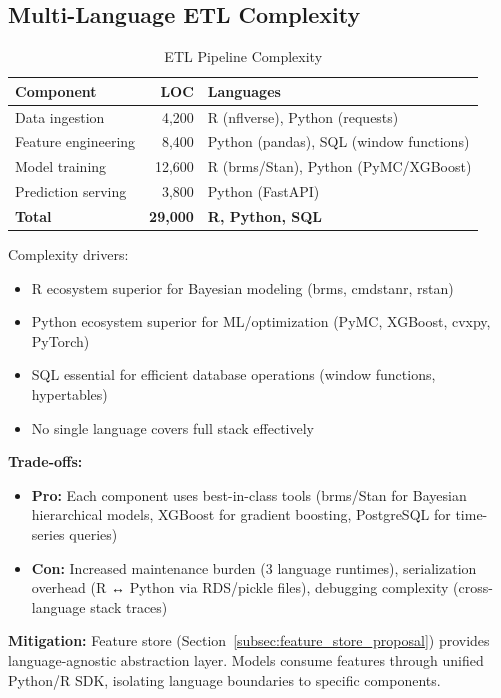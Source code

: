 \subsection{Multi-Language ETL Complexity}

\begin{table}[htbp]
\centering
\caption{ETL Pipeline Complexity}
\label{tab:etl_complexity}
\begin{tabular}{@{}lrp{5cm}@{}}
\toprule
\textbf{Component} & \textbf{LOC} & \textbf{Languages} \\
\midrule
Data ingestion & 4,200 & R (nflverse), Python (requests) \\
Feature engineering & 8,400 & Python (pandas), SQL (window functions) \\
Model training & 12,600 & R (brms/Stan), Python (PyMC/XGBoost) \\
Prediction serving & 3,800 & Python (FastAPI) \\
\midrule
\textbf{Total} & \textbf{29,000} & \textbf{R, Python, SQL} \\
\bottomrule
\end{tabular}
\end{table}

Complexity drivers:
\begin{itemize}
    \item R ecosystem superior for Bayesian modeling (brms, cmdstanr, rstan)
    \item Python ecosystem superior for ML/optimization (PyMC, XGBoost, cvxpy, PyTorch)
    \item SQL essential for efficient database operations (window functions, hypertables)
    \item No single language covers full stack effectively
\end{itemize}

\textbf{Trade-offs:}
\begin{itemize}
    \item \textbf{Pro:} Each component uses best-in-class tools (brms/Stan for Bayesian hierarchical models, XGBoost for gradient boosting, PostgreSQL for time-series queries)
    \item \textbf{Con:} Increased maintenance burden (3 language runtimes), serialization overhead (R ↔ Python via RDS/pickle files), debugging complexity (cross-language stack traces)
\end{itemize}

\textbf{Mitigation:} Feature store (Section~\ref{subsec:feature_store_proposal}) provides language-agnostic abstraction layer. Models consume features through unified Python/R SDK, isolating language boundaries to specific components.

